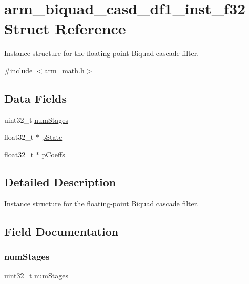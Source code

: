 \hypertarget{structarm__biquad__casd__df1__inst__f32}{}\section{arm\+\_\+biquad\+\_\+casd\+\_\+df1\+\_\+inst\+\_\+f32 Struct Reference}
\label{structarm__biquad__casd__df1__inst__f32}


Instance structure for the floating-\/point Biquad cascade filter.  




{\ttfamily \#include $<$arm\+\_\+math.\+h$>$}

\subsection*{Data Fields}
\begin{DoxyCompactItemize}
\item 
uint32\+\_\+t \hyperlink{structarm__biquad__casd__df1__inst__f32_aed9c8a6224cd149e8e12b17b25b9b767}{num\+Stages}
\item 
float32\+\_\+t $\ast$ \hyperlink{structarm__biquad__casd__df1__inst__f32_a335c87e6fdc4b96601d95a5de8b9c463}{p\+State}
\item 
float32\+\_\+t $\ast$ \hyperlink{structarm__biquad__casd__df1__inst__f32_aacbb8dd8eeba4b21fc2bb40076405ee3}{p\+Coeffs}
\end{DoxyCompactItemize}


\subsection{Detailed Description}
Instance structure for the floating-\/point Biquad cascade filter. 

\subsection{Field Documentation}
\mbox{\label{structarm__biquad__casd__df1__inst__f32_aed9c8a6224cd149e8e12b17b25b9b767}} 
\subsubsection{\texorpdfstring{num\+Stages}{numStages}}
{\footnotesize\ttfamily uint32\+\_\+t num\+Stages}

